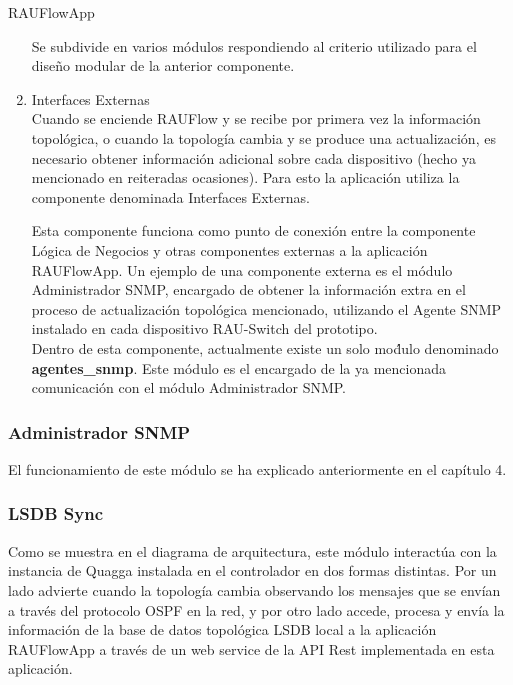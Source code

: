 \begin{subsubsection}{RAUFlowApp}
\begin{enumerate}
Se subdivide en varios m\'odulos respondiendo al criterio utilizado para el dise\~no modular de la anterior componente. 

\item Interfaces Externas\\
Cuando se enciende RAUFlow y se recibe por primera vez la informaci\'on topol\'ogica, o cuando la topolog\'ia cambia y se produce una actualizaci\'on, es necesario obtener informaci\'on adicional sobre cada dispositivo (hecho ya mencionado en reiteradas ocasiones). Para esto la aplicaci\'on utiliza la componente denominada Interfaces Externas. 

Esta componente funciona como punto de conexi\'on entre la componente L\'ogica de Negocios y otras componentes externas a la aplicaci\'on RAUFlowApp. Un ejemplo de una componente externa es el m\'odulo Administrador SNMP, encargado de obtener la informaci\'on extra en el proceso de actualizaci\'on topol\'ogica mencionado, utilizando el Agente SNMP instalado en cada dispositivo RAU-Switch del prototipo.\\

Dentro de esta componente, actualmente existe un solo mo\'dulo denominado \textbf{agentes\_snmp}. Este m\'odulo es el encargado de la ya mencionada comunicaci\'on con el m\'odulo Administrador SNMP. \\ 

\end{enumerate}

\end{subsubsection}

\subsubsection{Administrador SNMP}
El funcionamiento de este m\'odulo se ha explicado anteriormente en el cap\'itulo 4.

\subsubsection{LSDB Sync}
Como se muestra en el diagrama de arquitectura, este m\'odulo interact\'ua con la instancia de Quagga instalada en el controlador en dos formas distintas. Por un lado advierte cuando la topolog\'ia cambia observando los mensajes que se env\'ian a través del protocolo OSPF en la red, y por otro lado accede, procesa y env\'ia la informaci\'on de la base de datos topol\'ogica LSDB local a la aplicaci\'on RAUFlowApp a trav\'es de un web service de la API Rest implementada en esta aplicaci\'on.
 
